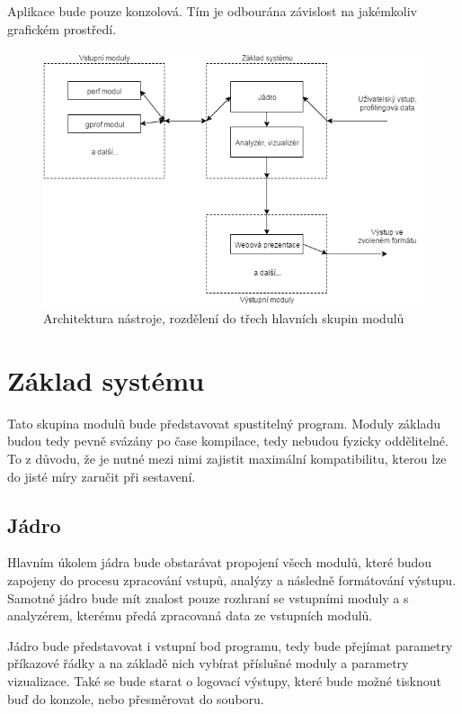 \documentclass[czech,BP]{thesiskiv}
\begin{document}
Aplikace bude pouze konzolová. Tím je odbourána závislost na jakémkoliv grafickém prostředí.

\begin{figure}[h]
    \centering
    \includegraphics[interpolate,width=1.0\textwidth]{img/system_diagr.png}
    \caption{Architektura nástroje, rozdělení do třech hlavních skupin modulů}
    \label{obr:systemmodules}
\end{figure}

\section{Základ systému}

Tato skupina modulů bude představovat spustitelný program. Moduly základu budou tedy pevně svázány po čase kompilace, tedy nebudou fyzicky oddělitelné. To z důvodu, že je nutné mezi nimi zajistit maximální kompatibilitu, kterou lze do jisté míry zaručit při sestavení.

\subsection{Jádro}

Hlavním úkolem jádra bude obstarávat propojení všech modulů, které budou zapojeny do procesu zpracování vstupů, analýzy a následně formátování výstupu. Samotné jádro bude mít znalost pouze rozhraní se vstupními moduly a s analyzérem, kterému předá zpracovaná data ze vstupních modulů.

Jádro bude představovat i vstupní bod programu, tedy bude přejímat parametry příkazové řádky a na základě nich vybírat příslušné moduly a parametry vizualizace. Také se bude starat o logovací výstupy, které bude možné tisknout buď do konzole, nebo přesměrovat do souboru.
\end{document}
